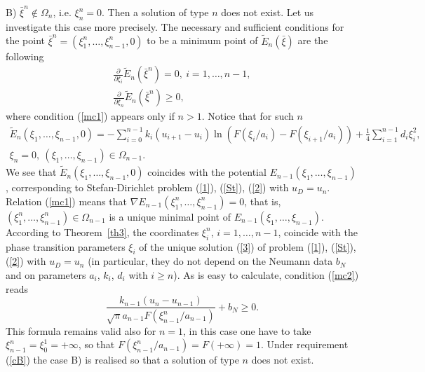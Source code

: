 \documentclass[12pt]{article}
\theoremstyle{plain}
\theoremstyle{definition}
\numberwithin{equation}{section}
\begin{document}
B) $\bar\xi^n\notin\Omega_n$, i.e. $\xi_n^n=0$. Then a solution of type $n$ does not exist. Let us investigate this case more precisely. The necessary and sufficient conditions for the point $\bar\xi^n=(\xi_1^n,\ldots,\xi_{n-1}^n,0)$ to be a minimum point of $\tilde E_n(\bar\xi)$ are the following
\begin{align}
\label{mc1}
\frac{\partial}{\partial\xi_i} \tilde E_n(\bar\xi^n)=0, \ i=1,\ldots,n-1, \\
\label{mc2}
\frac{\partial}{\partial\xi_n} \tilde E_n(\bar\xi^n)\ge 0,
\end{align}
where condition (\ref{mc1}) appears only if $n>1$. Notice that for such $n$
\begin{align*}
\tilde E_n(\xi_1,\ldots,\xi_{n-1},0)=-\sum_{i=0}^{n-1}k_i(u_{i+1}-u_i)\ln (F(\xi_i/a_i)-F(\xi_{i+1}/a_i))
+\frac{1}{4}\sum_{i=1}^{n-1} d_i\xi_i^2, \\ \xi_n=0, \ (\xi_1,\ldots,\xi_{n-1})\in\Omega_{n-1}.
\end{align*}
We see that $\tilde E_n(\xi_1,\ldots,\xi_{n-1},0)$ coincides with the potential $E_{n-1}(\xi_1,\ldots,\xi_{n-1})$, corresponding to
Stefan-Dirichlet problem (\ref{1}), (\ref{St}), (\ref{2}) with $u_D=u_n$.
Relation (\ref{mc1}) means that $\nabla E_{n-1}(\xi_1^n,\ldots,\xi_{n-1}^n)=0$, that is, $(\xi_1^n,\ldots,\xi_{n-1}^n)\in\Omega_{n-1}$ is a unique minimal point of $E_{n-1}(\xi_1,\ldots,\xi_{n-1})$. According to Theorem~\ref{th3}, the coordinates $\xi_i^n$, $i=1,\ldots,n-1$, coincide with the phase transition parameters $\xi_i$ of the unique solution (\ref{3}) of problem (\ref{1}), (\ref{St}), (\ref{2}) with $u_D=u_n$ (in particular, they do not depend on the Neumann data $b_N$ and on parameters $a_i$, $k_i$, $d_i$ with $i\ge n$). As is easy to calculate, condition (\ref{mc2}) reads
\begin{equation}\label{cB}
\frac{k_{n-1}(u_n-u_{n-1})}{\sqrt{\pi}a_{n-1}F(\xi_{n-1}^n/a_{n-1})}+b_N\ge 0.
\end{equation}
This formula remains valid also for $n=1$, in this case one have to take $\xi_{n-1}^n=\xi_0^1=+\infty$, so that
$F(\xi_{n-1}^n/a_{n-1})=F(+\infty)=1$. Under requirement (\ref{cB}) the case B) is realised so that a solution of type $n$ does not exist.
\end{document}
